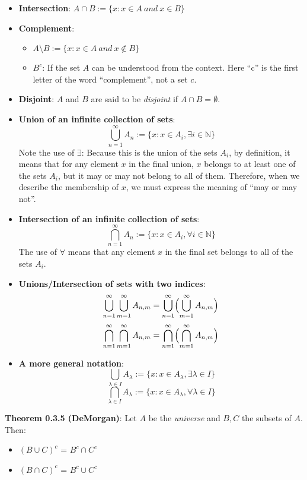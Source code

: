 \documentclass[12pt, letterpaper, oneside]{book}
\begin{document}
\begin{itemize}
  \item \textbf{Intersection}: $A \cap B := \{x: x \in A \ and \ x \in B\}$
  \item \textbf{Complement}:
    \begin{itemize}
      \item $A \setminus B := \{x: x \in A \ and \ x \notin B\}$
      \item $B^c$: If the set $A$ can be understood from the context. Here ``c''
        is the first letter of the word ``complement'', not a set $c$.
    \end{itemize}
  \item \textbf{Disjoint}: $A$ and $B$ are said to be \textit{disjoint} if $A
    \cap B = \emptyset$.
  \item \textbf{Union of an infinite collection of sets}:
    \[
      \bigcup_{n=1}^{\infty} A_n := \{x: x \in A_i, \exists i \in \mathbb{N}\}
    \]
    Note the use of $\exists$: Because this is the union of the sets $A_i$,
    by definition, it means that for any element $x$ in the final union, $x$
    belongs to at least one of the sets $A_i$, but it may or may not belong to
    all of them. Therefore, when we describe the membership of $x$, we must
    express the meaning of ``may or may not''.
  \item \textbf{Intersection of an infinite collection of sets}:
    \[
      \bigcap_{n=1}^{\infty} A_n := \{x: x \in A_i, \forall i \in \mathbb{N}\}
    \]
    The use of $\forall$ means that any element $x$ in the final set belongs
    to all of the sets $A_i$.
  \item \textbf{Unions/Intersection of sets with two indices}:
    \[
      \bigcup_{n=1}^{\infty} \bigcup_{m=1}^{\infty} A_{n,m} =
      \bigcup_{n=1}^{\infty} \Bigl(\bigcup_{m=1}^{\infty} A_{n,m}\Bigr)
    \]
    \[
      \bigcap_{n=1}^{\infty} \bigcap_{m=1}^{\infty} A_{n,m} =
      \bigcap_{n=1}^{\infty} \Bigl(\bigcap_{m=1}^{\infty} A_{n,m}\Bigr)
    \]
  \item \textbf{A more general notation}:
    \[
      \bigcup_{\lambda \in I} A_{\lambda} :=
      \{x: x \in A_{\lambda}, \exists \lambda \in I\}
    \]
    \[
      \bigcap_{\lambda \in I} A_{\lambda} :=
      \{x: x \in A_{\lambda}, \forall \lambda \in I\}
    \]
\end{itemize}

\textbf{Theorem 0.3.5 (DeMorgan)}: Let $A$ be the \textit{universe} and $B, C$
the subsets of $A$. Then:

\begin{itemize}
  \item $(B \cup C)^c$ = $B^c \cap C^c$
  \item $(B \cap C)^c$ = $B^c \cup C^c$
\end{itemize}
\end{document}

